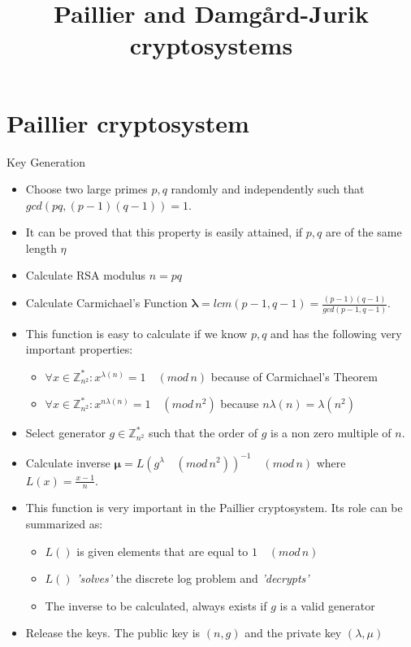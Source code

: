 \documentclass{beamer}
\title{Paillier and Damg{\aa}rd-Jurik cryptosystems}
\begin{document}
\newcommand{\zns}[1]{ \mathbb{Z}_{#1}^* }
\newcommand{\zn}[1]{ \mathbb{Z}_{#1}}
\newcommand{\md}[1]{\quad (mod \, {#1})}
 
 
\begin{frame}
\titlepage
\end{frame}

\section{Paillier cryptosystem \cite{Paillier99}}
\frame{\sectionpage}
\begin{frame}[allowframebreaks]{Key Generation}

\begin{itemize}
\item Choose two large primes $p,q$ randomly and independently such that $gcd(p  q,(p-1)  (q-1))=1$.
\item It can be proved that this property is easily attained, if $p,q$ are of the same length $\eta$ 
\item Calculate RSA modulus $ n = pq $ 
\item Calculate Carmichael's Function $ \bm{\lambda} = lcm(p-1,q-1)= \frac{(p-1) (q-1)}{gcd(p-1,q-1)} $.
\item This function is easy to calculate if we know $p,q$ and has the following very important properties:
\begin{itemize}
	\item $ \forall x \in \zns{n^2}: x^{\lambda(n)} =  1 \md{n} $ because of Carmichael's Theorem
	\item $ \forall x \in \zns{n^2}: x^{n  \lambda(n)} =  1 \md{n^2} $ because $n\lambda(n)=\lambda(n^2)$
\end{itemize}
\item Select generator $g \in \zns{n^2}$ such that the order of $g$ is a non zero multiple of $n$.
\item Calculate inverse  $\bm{\mu} = L(g^\lambda \md{n^2} )^{-1} \md{n}$  where  $L(x) = \frac{x-1}{n} $. 
\item This function is very important in the Paillier cryptosystem. Its role can be summarized as:
\begin{itemize}
\item $L()$ is given elements that are equal to $1 \md{n}$
\item $L()$ \textit{'solves'} the discrete log problem and \textit{'decrypts'}
\item The inverse to be calculated, always exists if $g$ is a valid generator
\end{itemize}
\item Release the keys. The public key is $(n,g)$ and the private key $(\lambda,\mu)$ 
\end{itemize} 
\end{frame}
\end{document}
